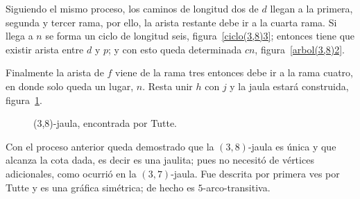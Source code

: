 \documentclass[12pt]{book}
\theoremstyle{definition}
\begin{document}
Siguiendo el mismo proceso, los caminos de longitud dos de $d$ llegan
a la primera, segunda y tercer rama, por ello, la arista restante debe
ir a la cuarta rama. Si llega a $n$ se forma un ciclo de longitud
seis, figura~\ref{ciclo(3,8)3}; entonces tiene que existir arista
entre $d$ y $p$; y con esto queda determinada $cn$,
figura~\ref{arbol(3,8)2}.

Finalmente la arista de $f$ viene de la rama tres entonces debe ir a
la rama cuatro, en donde solo queda un lugar, $n$. Resta unir $h$ con
$j$ y la jaula estará construida, figura~\ref{jaula(3,8)}.



\begin{figure}
  \centering
  \caption{(3,8)-jaula, encontrada por Tutte.} \label{jaula(3,8)}
\end{figure}




Con el proceso anterior queda demostrado que la $(3,8)$-jaula es única
y que alcanza la cota dada, es decir es una jaulita; pues no necesitó
de vértices adicionales, como ocurrió en la $(3,7)$-jaula. Fue
descrita por primera ves por Tutte y es una gráfica simétrica; de
hecho es $5$-arco-transitiva.
\end{document}
